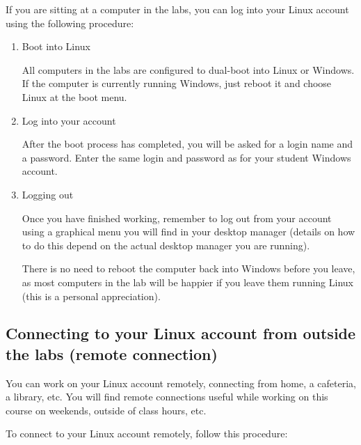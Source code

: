 \documentclass[a4paper, 12pt]{article}
\begin{document}
  If you are sitting at a computer in the labs, you can log into your Linux
  account using the following procedure:

  \begin{enumerate}

    \item Boot into Linux

      All computers in the labs are configured to
      dual-boot into Linux or Windows. If the computer is currently running
      Windows, just reboot it and choose Linux at the boot menu.

    \item Log into your account

      After the boot process has completed, you
      will be asked for a login name and a password. Enter the same login and
      password as for your student Windows account.

    \item Logging out

      Once you have finished working, remember to log out from
      your account using a graphical menu you will find in your desktop manager
      (details on how to do this depend on the actual desktop manager you are
      running).

      There is no need to reboot the computer back into Windows
      before you leave, as most computers in the lab will be happier if you
      leave them running Linux (this is a personal appreciation).

  \end{enumerate}

  \subsection{Connecting to your Linux account from outside the labs (remote
  connection)}

  You can work on your Linux account remotely, connecting from home, a
  cafeteria, a library, etc.  You will find remote connections useful while
  working on this course on weekends, outside of class hours, etc.

  To connect to your Linux account remotely, follow this procedure:
\end{document}
